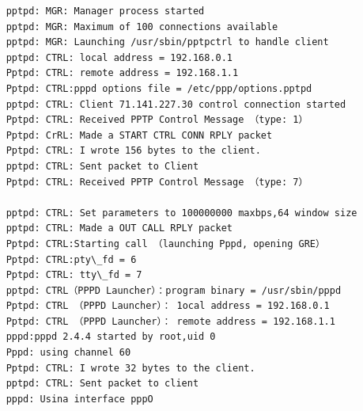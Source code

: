 \begin{verbatim}
    pptpd: MGR: Manager process started
    pptpd: MGR: Maximum of 100 connections available
    pptpd: MGR: Launching /usr/sbin/pptpctrl to handle client
    pptpd: CTRL: local address = 192.168.0.1
    Pptpd: CTRL: remote address = 192.168.1.1
    Pptpd: CTRL:pppd options file = /etc/ppp/options.pptpd
    pptpd: CTRL: Client 71.141.227.30 control connection started
    Pptpd: CTRL: Received PPTP Control Message （type: 1）
    Pptpd: CrRL: Made a START CTRL CONN RPLY packet
    Pptpd: CTRL: I wrote 156 bytes to the client.
    pptpd: CTRL: Sent packet to Client
    Pptpd: CTRL: Received PPTP Control Message （type: 7）

    pptpd: CTRL: Set parameters to 100000000 maxbps,64 window size
    pptpd: CTRL: Made a OUT CALL RPLY packet
    Pptpd: CTRL:Starting call （launching Pppd, opening GRE）
    Pptpd: CTRL:pty\_fd = 6
    Pptpd: CTRL: tty\_fd = 7
    pptpd: CTRL（PPPD Launcher）：program binary = /usr/sbin/pppd
    Pptpd: CTRL （PPPD Launcher）： 1ocal address = 192.168.0.1
    Pptpd: CTRL （PPPD Launcher）： remote address = 192.168.1.1
    pppd:pppd 2.4.4 started by root,uid 0
    Pppd: using channel 60
    Pptpd: CTRL: I wrote 32 bytes to the client.
    pptpd: CTRL: Sent packet to client
    pppd: Usina interface pppO


\end{verbatim}
